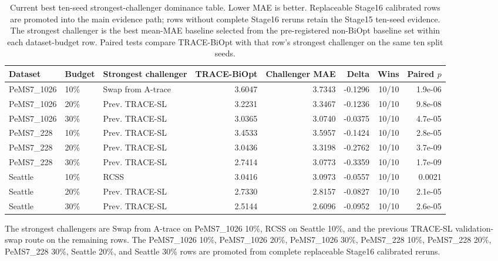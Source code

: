 \begin{table}[pos=htbp]
\centering
\caption{Current best ten-seed strongest-challenger dominance table. Lower MAE is better. Replaceable Stage16 calibrated rows are promoted into the main evidence path; rows without complete Stage16 reruns retain the Stage15 ten-seed evidence. The strongest challenger is the best mean-MAE baseline selected from the pre-registered non-BiOpt baseline set within each dataset-budget row. Paired tests compare TRACE-BiOpt with that row's strongest challenger on the same ten split seeds.}
\label{tab:trace-biopt-dominance}
\scriptsize
\setlength{\tabcolsep}{4pt}
\begin{tabular}{llp{}rrrrr}
\toprule
Dataset & Budget & Strongest challenger & TRACE-BiOpt & Challenger MAE & Delta & Wins & Paired $p$ \\
\midrule
PeMS7\_1026 & 10\% & Swap from A-trace & 3.6047 & 3.7343 & -0.1296 & 10/10 & 1.9e-06 \\
PeMS7\_1026 & 20\% & Prev. TRACE-SL & 3.2231 & 3.3467 & -0.1236 & 10/10 & 9.8e-08 \\
PeMS7\_1026 & 30\% & Prev. TRACE-SL & 3.0365 & 3.0740 & -0.0375 & 10/10 & 4.7e-05 \\
PeMS7\_228 & 10\% & Prev. TRACE-SL & 3.4533 & 3.5957 & -0.1424 & 10/10 & 2.8e-05 \\
PeMS7\_228 & 20\% & Prev. TRACE-SL & 3.0436 & 3.3198 & -0.2762 & 10/10 & 3.7e-09 \\
PeMS7\_228 & 30\% & Prev. TRACE-SL & 2.7414 & 3.0773 & -0.3359 & 10/10 & 1.7e-09 \\
Seattle & 10\% & RCSS & 3.0416 & 3.0973 & -0.0557 & 10/10 & 0.0021 \\
Seattle & 20\% & Prev. TRACE-SL & 2.7330 & 2.8157 & -0.0827 & 10/10 & 2.1e-05 \\
Seattle & 30\% & Prev. TRACE-SL & 2.5144 & 2.6096 & -0.0952 & 10/10 & 2.6e-05 \\
\bottomrule
\end{tabular}
\vspace{0.35em}
\parbox{0.96\textwidth}{\small The strongest challengers are Swap from A-trace on PeMS7\_1026 10\%, RCSS on Seattle 10\%, and the previous TRACE-SL validation-swap route on the remaining rows. The PeMS7\_1026 10\%, PeMS7\_1026 20\%, PeMS7\_1026 30\%, PeMS7\_228 10\%, PeMS7\_228 20\%, PeMS7\_228 30\%, Seattle 20\%, and Seattle 30\% rows are promoted from complete replaceable Stage16 calibrated reruns.}
\end{table}
